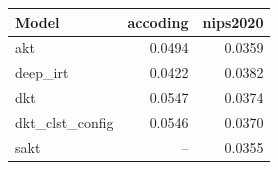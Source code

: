 \begin{tabular}{lrr}
\toprule
Model & accoding & nips2020 \\
\midrule
akt & 0.0494 & 0.0359 \\
deep\_irt & 0.0422 & 0.0382 \\
dkt & 0.0547 & 0.0374 \\
dkt\_clst\_config & 0.0546 & 0.0370 \\
sakt & -- & 0.0355 \\
\bottomrule
\end{tabular}
